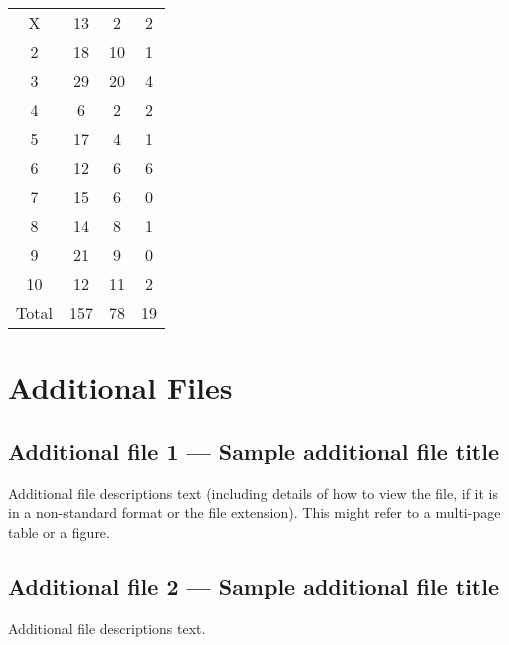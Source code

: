 \documentclass{bmcart}
\begin{document}
\begin{backmatter}
\begin{table}[h!]
\begin{tabular}{cccc}
		X & 13 & 2 & 2\\
		2 & 18 & 10 & 1\\
		3 & 29 & 20 & 4\\
		4 & 6 & 2 & 2\\
		5 & 17 & 4 & 1\\
		6 & 12 & 6 & 6\\
		7 & 15 & 6 & 0\\
		8 & 14 & 8 & 1\\
		9 & 21 & 9 & 0\\
		10 & 12 & 11 & 2\\ \hline
		Total & 157 & 78 & 19\\ \hline
	\end{tabular}
\end{table}




\section*{Additional Files}
  \subsection*{Additional file 1 --- Sample additional file title}
    Additional file descriptions text (including details of how to
    view the file, if it is in a non-standard format or the file extension).  This might
    refer to a multi-page table or a figure.

  \subsection*{Additional file 2 --- Sample additional file title}
    Additional file descriptions text.


\end{backmatter}
\end{document}
